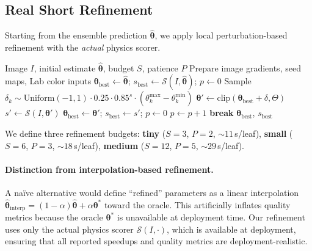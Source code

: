 \documentclass[11pt,a4paper]{article}
\newcommand{\btheta}{\boldsymbol{\theta}}
\newcommand{\cS}{\mathcal{S}}
\begin{document}
\subsection{Real Short Refinement}
\label{sec:refinement}

Starting from the ensemble prediction $\hat{\btheta}$, we apply
local perturbation-based refinement with the \emph{actual} physics scorer.

\begin{algorithm}[h]
\caption{Real Short Refinement}
\label{alg:refinement}
\begin{algorithmic}[1]
\REQUIRE Image $I$, initial estimate $\hat{\btheta}$, budget $S$, patience $P$
\STATE Prepare image gradients, seed maps, Lab color inputs
\STATE $\btheta_\text{best} \leftarrow \hat{\btheta}$; $s_\text{best} \leftarrow \cS(I, \hat{\btheta})$; $p \leftarrow 0$
  \STATE Sample $\delta_k \sim \text{Uniform}(-1, 1) \cdot 0.25 \cdot 0.85^s \cdot (\theta_k^\text{max} - \theta_k^\text{min})$
  \STATE $\btheta' \leftarrow \text{clip}(\btheta_\text{best} + \delta, \Theta)$
  \STATE $s' \leftarrow \cS(I, \btheta')$
    \STATE $\btheta_\text{best} \leftarrow \btheta'$; $s_\text{best} \leftarrow s'$; $p \leftarrow 0$
  \ELSE
    \STATE $p \leftarrow p + 1$
  \ENDIF
    \STATE \textbf{break} 
  \ENDIF
\ENDFOR
\RETURN $\btheta_\text{best}$, $s_\text{best}$
\end{algorithmic}
\end{algorithm}

We define three refinement budgets:
\textbf{tiny} ($S{=}3$, $P{=}2$, ${\sim}11$\,s/leaf),
\textbf{small} ($S{=}6$, $P{=}3$, ${\sim}18$\,s/leaf),
\textbf{medium} ($S{=}12$, $P{=}5$, ${\sim}29$\,s/leaf).

\paragraph{Distinction from interpolation-based refinement.}
A na\"ive alternative would define ``refined'' parameters as a linear interpolation
$\hat{\btheta}_\text{interp} = (1-\alpha)\hat{\btheta} + \alpha\btheta^*$ toward the oracle.
This artificially inflates quality metrics because the oracle $\btheta^*$ is
unavailable at deployment time. Our refinement uses only the actual physics
scorer $\cS(I, \cdot)$, which is available at deployment, ensuring that
all reported speedups and quality metrics are deployment-realistic.
\end{document}

